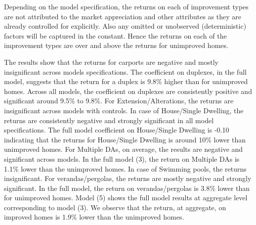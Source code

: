 \documentclass[AEJ,reqno, draftmode]{AEA} %
\begin{document}
Depending on the model specification, the returns on each of improvement types are not attributed to the market appreciation and other attributes as they are already controlled for explicitly. Also any omitted or unobserved (deterministic) factors will be captured in the constant. Hence the returns on each of the improvement types are over and above the returns for unimproved homes. 


\restoregeometry

The results show that the returns for carports are negative and mostly insignificant across models specifications. The coefficient on duplexes, in the full model, suggests that the return for a duplex is 9.8\% higher than for unimproved homes. Across all models, the coefficient on duplexes are consistently positive and significant around 9.5\% to 9.8\%. For Extension/Alterations, the returns are insignificant across models with controls. In case of House/Single Dwelling, the returns are consistently negative and strongly significant in all model specifications. The full model coefficient on House/Single Dwelling is -0.10 indicating that the returns for House/Single Dwelling is around 10\% lower than unimproved homes. For Multiple DAs, on average, the results are negative and significant across models. In the full model (3), the return on Multiple DAs is 1.1\% lower than the unimproved homes. In case of Swimming pools, the returns insignificant. For verandas/pergolas, the returns are mostly negative and strongly significant. In the full model, the return on verandas/pergolas is 3.8\% lower than for unimproved homes. Model (5) shows the full model results at aggregate level corresponding to model (3). We observe that the return, at aggregate, on improved homes is 1.9\% lower than the unimproved homes.

\end{document}
